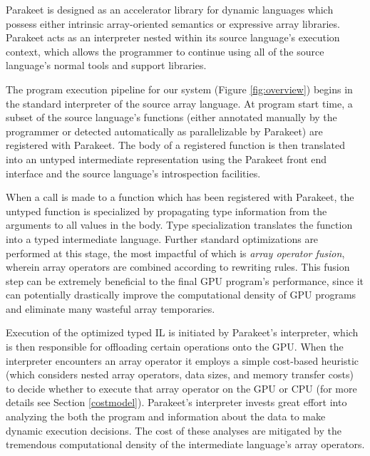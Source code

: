 \documentclass[preprint]{sigplanconf}
\begin{document}
Parakeet is designed as an accelerator library for dynamic languages which possess either intrinsic array-oriented semantics or expressive array libraries. Parakeet acts as an interpreter nested within its source language's execution context, which allows the programmer to continue using all of the source language's normal tools and support libraries.

The program execution pipeline for our system (Figure \ref{fig:overview}) begins in the standard interpreter of the source array language. At program start time, a subset of the source language's functions (either annotated manually by the programmer or detected automatically as parallelizable by Parakeet) are registered with Parakeet. The body of a registered function is then translated into an untyped intermediate representation using the Parakeet front end interface and the source language's introspection facilities.

When a call is made to a function which has been registered with Parakeet, the untyped function is specialized by propagating type information from the arguments to all values in the body.  Type specialization translates the function into a typed intermediate language. Further standard optimizations are performed at this stage, the most impactful of which is \emph{array operator fusion}, wherein array operators are combined according to rewriting rules. This fusion step can be extremely beneficial to the final GPU program's performance, since it can potentially drastically improve the computational density of GPU programs and eliminate many wasteful array temporaries. 

Execution of the optimized typed IL is initiated by Parakeet's interpreter, which is then responsible for offloading certain operations onto the GPU. When the interpreter encounters an array operator it employs a simple cost-based heuristic (which considers nested array operators, data sizes, and memory transfer costs) to decide whether to execute that array operator on the GPU or CPU (for more details see Section \ref{costmodel}). Parakeet's interpreter invests great effort into analyzing the both the program and information about the data to make dynamic execution decisions. The cost of these analyses are mitigated by the tremendous computational density of the intermediate language's array operators. 
\end{document}
